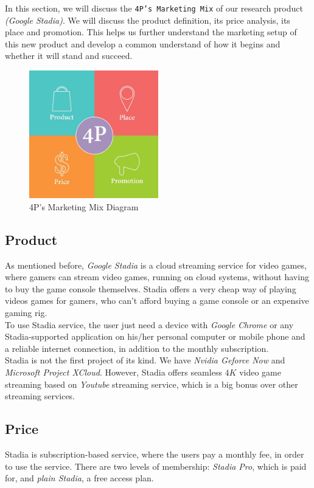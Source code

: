 In this section, we will discuss the \texttt{4P's Marketing Mix} of our research product \emph{(Google Stadia)}. We will discuss the product definition, its price analysis, its place and promotion. This helps us further understand the marketing setup of this new product and develop a common understand of how it begins and whether it will stand and succeed.

\begin{figure}[h]
    \centering
    \includegraphics[width=0.5\textwidth]{images/4p.jpg}
    \caption{4P's Marketing Mix Diagram}
    \label{fig:4p}
\end{figure}

\subsection{Product}
As mentioned before, \emph{Google Stadia} is a cloud streaming service for video games, where gamers can stream video games, running on cloud systems, without having to buy the game console themselves. Stadia offers a very cheap way of playing videos games for gamers, who can't afford buying a game console or an expensive gaming rig. \\

To use Stadia service, the user just need a device with \emph{Google Chrome} or any Stadia-supported application on his/her personal computer or mobile phone and a reliable internet connection, in addition to the monthly subscription. \\

Stadia is not the first project of its kind. We have \emph{Nvidia Geforce Now} and \emph{Microsoft Project XCloud}. However, Stadia offers seamless $4K$ video game streaming based on \emph{Youtube} streaming service, which is a big bonus over other streaming services. 

\subsection{Price}
Stadia is subscription-based service, where the users pay a monthly fee, in order to use the service. There are two levels of membership: \emph{Stadia Pro}, which is paid for, and \emph{plain Stadia}, a free access plan. \\

